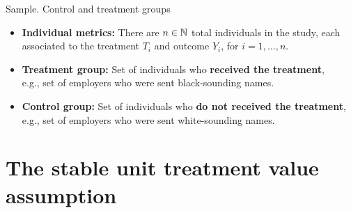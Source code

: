 \documentclass[aspectratio=169]{beamer}
\begin{document}
    
    

\begin{frame}{Sample. Control and treatment groups}
    
  \begin{itemize} 
    \item \textbf{Individual metrics:} There are $n \in \mathbb{N}$ total individuals in the study, each associated to the treatment $T_i$ and outcome $Y_i$, for $i = 1,\dots, n$.
    
    \item \textbf{Treatment group:} Set of individuals who \textbf{received the treatment}, \\ 
    \textcolor{deepskyblue3}{e.g., set of employers who were sent black-sounding names.}

    \item \textbf{Control group:} Set of individuals who \textbf{do not received the treatment}, \\
    \textcolor{deepskyblue3}{e.g., set of employers who were sent white-sounding names.}

\end{itemize}
    
\end{frame}

\section{\Large The stable unit treatment value assumption}
\end{document}
